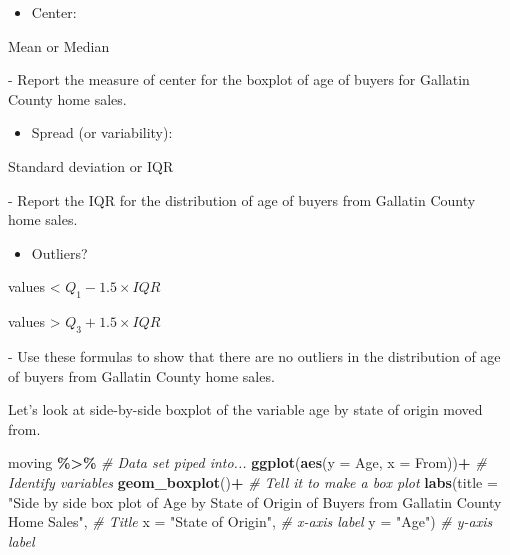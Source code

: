 \documentclass[
]{report}
\newenvironment{Shaded}{\begin{snugshade}}{\end{snugshade}}
\newcommand{\AttributeTok}[1]{\textcolor[rgb]{0.13,0.29,0.53}{#1}}
\newcommand{\CommentTok}[1]{\textcolor[rgb]{0.56,0.35,0.01}{\textit{#1}}}
\newcommand{\FunctionTok}[1]{\textcolor[rgb]{0.13,0.29,0.53}{\textbf{#1}}}
\newcommand{\NormalTok}[1]{#1}
\newcommand{\SpecialCharTok}[1]{\textcolor[rgb]{0.81,0.36,0.00}{\textbf{#1}}}
\newcommand{\StringTok}[1]{\textcolor[rgb]{0.31,0.60,0.02}{#1}}
\providecommand{\tightlist}{%
  \setlength{\itemsep}{0pt}\setlength{\parskip}{0pt}}
\newcommand{\rgi}{\hspace{24pt}}  %
\begin{document}
\begin{itemize}
\tightlist
\item
  Center:
\end{itemize}

\rgi Mean or Median

\rgi \rgi - Report the measure of center for the boxplot of age of buyers for Gallatin County home sales.

\vspace{0.3in}

\begin{itemize}
\tightlist
\item
  Spread (or variability):
\end{itemize}

\rgi Standard deviation or IQR

\rgi \rgi - Report the IQR for the distribution of age of buyers from Gallatin County home sales.

\vspace{0.3in}

\begin{itemize}
\tightlist
\item
  Outliers?
\end{itemize}

\rgi values \textless{} \(Q_1 - 1.5 \times IQR\)

\rgi values \textgreater{} \(Q_3 + 1.5 \times IQR\)

\rgi \rgi - Use these formulas to show that there are no outliers in the distribution of age of buyers from Gallatin County home sales.

\vspace{0.8in}
\newpage

Let's look at side-by-side boxplot of the variable age by state of origin moved from.

\begin{Shaded}
\begin{Highlighting}[]
\NormalTok{moving }\SpecialCharTok{\%\textgreater{}\%}  \CommentTok{\# Data set piped into...}
  \FunctionTok{ggplot}\NormalTok{(}\FunctionTok{aes}\NormalTok{(}\AttributeTok{y =}\NormalTok{ Age, }\AttributeTok{x =}\NormalTok{ From))}\SpecialCharTok{+}  \CommentTok{\# Identify variables}
  \FunctionTok{geom\_boxplot}\NormalTok{()}\SpecialCharTok{+}  \CommentTok{\# Tell it to make a box plot}
  \FunctionTok{labs}\NormalTok{(}\AttributeTok{title =} \StringTok{"Side by side box plot of Age by State of Origin }
\StringTok{  of Buyers from Gallatin County Home Sales"}\NormalTok{,  }\CommentTok{\# Title}
       \AttributeTok{x =} \StringTok{"State of Origin"}\NormalTok{,    }\CommentTok{\# x{-}axis label}
       \AttributeTok{y =} \StringTok{"Age"}\NormalTok{)  }\CommentTok{\# y{-}axis label}
\end{Highlighting}
\end{Shaded}
\end{document}
